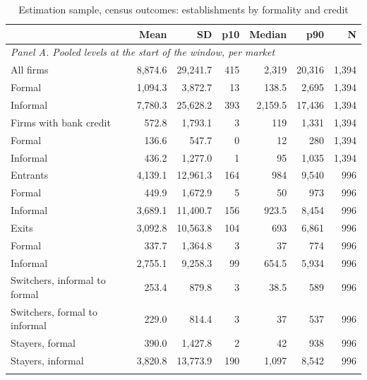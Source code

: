 \documentclass[12pt]{article}
\begin{document}
\begin{table}[H]
    \centering
    \caption{Estimation sample, census outcomes: establishments by formality and credit}
    \label{tab:desc_sample_census}
    \begin{threeparttable}
        \small
        \setlength{\tabcolsep}{5pt}
        \renewcommand{\arraystretch}{0.9}
        \begin{tabular}{l r r r r r r}
            \toprule
             & Mean & SD & p10 & Median & p90 & N \\
            \midrule
            \multicolumn{7}{l}{\textit{Panel A. Pooled levels at the start of the window, per market}} \\
            All firms & 8,874.6 & 29,241.7 & 415 & 2,319 & 20,316 & 1,394 \\
            \quad Formal & 1,094.3 & 3,872.7 & 13 & 138.5 & 2,695 & 1,394 \\
            \quad Informal & 7,780.3 & 25,628.2 & 393 & 2,159.5 & 17,436 & 1,394 \\
            Firms with bank credit & 572.8 & 1,793.1 & 3 & 119 & 1,331 & 1,394 \\
            \quad Formal & 136.6 & 547.7 & 0 & 12 & 280 & 1,394 \\
            \quad Informal & 436.2 & 1,277.0 & 1 & 95 & 1,035 & 1,394 \\
            Entrants & 4,139.1 & 12,961.3 & 164 & 984 & 9,540 & 996 \\
            \quad Formal & 449.9 & 1,672.9 & 5 & 50 & 973 & 996 \\
            \quad Informal & 3,689.1 & 11,400.7 & 156 & 923.5 & 8,454 & 996 \\
            Exits & 3,092.8 & 10,563.8 & 104 & 693 & 6,861 & 996 \\
            \quad Formal & 337.7 & 1,364.8 & 3 & 37 & 774 & 996 \\
            \quad Informal & 2,755.1 & 9,258.3 & 99 & 654.5 & 5,934 & 996 \\
            Switchers, informal to formal & 253.4 & 879.8 & 3 & 38.5 & 589 & 996 \\
            Switchers, formal to informal & 229.0 & 814.4 & 3 & 37 & 537 & 996 \\
            Stayers, formal & 390.0 & 1,427.8 & 2 & 42 & 938 & 996 \\
            Stayers, informal & 3,820.8 & 13,773.9 & 190 & 1,097 & 8,542 & 996 \\
            \addlinespace[3pt]
            \multicolumn{7}{l}{\textit{Panel B. Five year changes, log points}} \\

\end{tabular}
\end{threeparttable}
\end{table}
\end{document}
